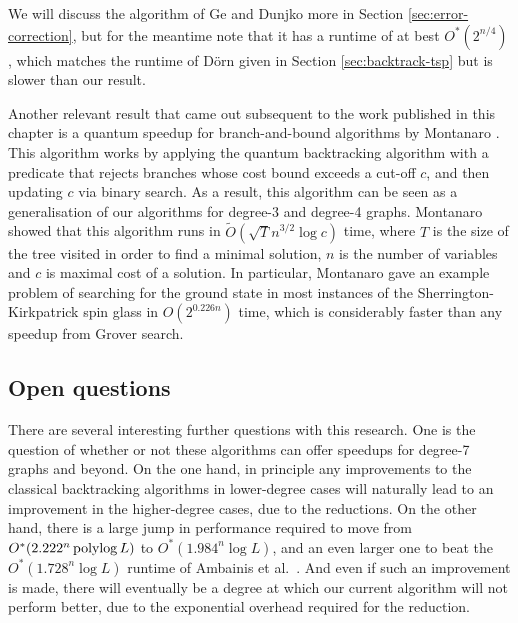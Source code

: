 We will discuss the algorithm of Ge and Dunjko more in Section \ref{sec:error-correction}, but for the meantime note that it has a runtime of at best $O^*(2^{n/4})$, which matches the runtime of D\"{o}rn \cite{dorn2007} given in Section \ref{sec:backtrack-tsp} but is slower than our result.

Another relevant result that came out subsequent to the work published in this chapter is a quantum speedup for branch-and-bound algorithms by Montanaro \cite{montanaro2019}. This algorithm works by applying the quantum backtracking algorithm with a predicate that rejects branches whose cost bound exceeds a cut-off $c$, and then updating $c$ via binary search. As a result, this algorithm can be seen as a generalisation of our algorithms for degree-3 and degree-4 graphs. Montanaro showed that this algorithm runs in $\tilde{O}(\sqrt{T}n^{3/2}\log c)$ time, where $T$ is the size of the tree visited in order to find a minimal solution, $n$ is the number of variables and $c$ is maximal cost of a solution. In particular, Montanaro gave an example problem of searching for the ground state in most instances of the Sherrington-Kirkpatrick spin glass in $O(2^{0.226n})$ time, which is considerably faster than any speedup from Grover search.

\subsection{Open questions}

There are several interesting further questions with this research. One is the question of whether or not these algorithms can offer speedups for degree-7 graphs and beyond. On the one hand, in principle any improvements to the classical backtracking algorithms in lower-degree cases will naturally lead to an improvement in the higher-degree cases, due to the reductions. On the other hand, there is a large jump in performance required to move from $O^*(2.222^n\operatorname{polylog} L)$ to $O^*(1.984^n\log L)$, and an even larger one to beat the $O^*(1.728^n\log L)$ runtime of Ambainis et al.~\cite{ambainis2018}. And even if such an improvement is made, there will eventually be a degree at which our current algorithm will not perform better, due to the exponential overhead required for the reduction.

